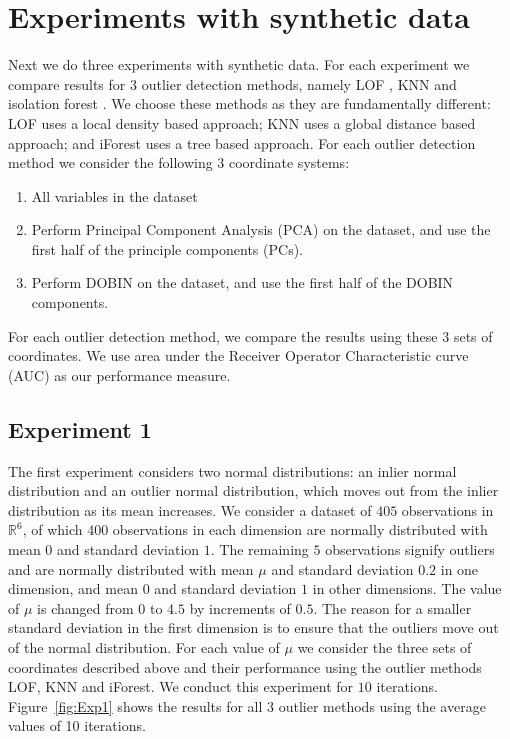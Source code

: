 \documentclass[11pt]{article}
\begin{document}
\section{Experiments with synthetic data}\label{sec:synthetic}
Next we do three experiments with synthetic data. For each experiment we compare results for $3$ outlier detection methods, namely LOF \citep{breunig2000lof}, KNN \citep{ramaswamy2000efficient} and isolation forest \citep{liu2008isolation}. We choose these methods as they are fundamentally different: LOF uses a local density based approach; KNN uses a global distance based approach; and iForest uses a  tree based approach.  For each outlier detection method we consider the following $3$ coordinate systems:  
\begin{enumerate}  
\item All variables in the dataset
\item Perform Principal Component Analysis (PCA) on the dataset, and use the first half of the principle components (PCs).
\item Perform DOBIN on the dataset, and use the first half of the DOBIN components. 
\end{enumerate}
For each outlier detection method, we compare the results using these $3$ sets of coordinates. We use area under the Receiver Operator Characteristic curve (AUC) as our performance measure. 


\subsection{Experiment 1}
The first experiment considers two normal distributions: an  inlier normal distribution and an outlier normal distribution, which moves out from the inlier distribution as its mean increases. We consider a dataset of $405$ observations in $\mathbb{R}^6$, of which $400$ observations in each dimension are normally distributed with mean $0$ and standard deviation $1$. The remaining $5$ observations signify outliers and are normally distributed with mean $\mu$ and standard deviation $0.2$ in one dimension, and mean $0$ and standard deviation $1$ in other dimensions. The value of $\mu$ is changed from $0$ to $4.5$ by increments of $0.5$. The reason for a smaller standard deviation in the first dimension is to ensure that the outliers move out of the normal distribution. For each value of $\mu$ we consider the three sets of coordinates described above and their performance using the outlier methods LOF, KNN and iForest.  We conduct this experiment for $10$ iterations. Figure~\ref{fig:Exp1} shows the results for all $3$  outlier methods using the average values of  10 iterations. 
\end{document}
